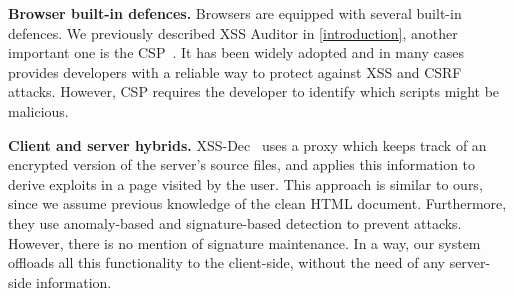 \noindent \textbf{Browser built-in defences.}  Browsers are equipped
with several built-in defences. We previously described XSS
Auditor in \autoref{introduction}, another important one is the 
 \ac{CSP}~\cite{CSP}. It has been widely adopted and
in many cases provides developers with a reliable way to protect
against \ac{XSS} and \ac{CSRF} attacks. However, \ac{CSP} requires the developer to identify which scripts
might be malicious.

\noindent \textbf{Client and server hybrids.}
XSS-Dec~\cite{Sundareswaran:2012:XHS:2352970.2352994} uses a proxy which keeps track of an encrypted version of the server's source files, and applies this information to derive exploits in a page visited by the user. This approach is similar to ours, since we assume previous
knowledge of the clean HTML document. Furthermore, they use anomaly-based and signature-based detection to prevent attacks. However, there is no mention of signature maintenance. In a way, our system offloads all this functionality to the client-side, without the need of any server-side information.

